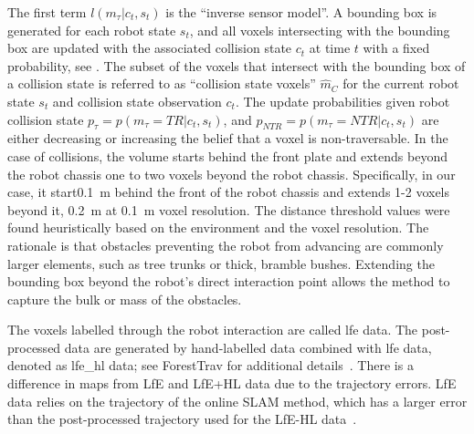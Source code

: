 The first term $l(m_\tau | c_t,  s_{t})$ is the ``inverse sensor model''. A bounding box is generated for each robot state $s_t$, and all voxels intersecting with the bounding box are updated with the associated collision state $c_t$ at time $t$ with a fixed probability, see . The subset of the voxels that intersect with the bounding box of a collision state is referred to as ``collision state voxels'' $\hat{m}_{C}$ for the current robot state $s_t$ and collision state observation $c_t$. The update probabilities given robot collision state $p_{\tau}= p(m_\tau = TR | c_t, s_{t}) $, and $p_{NTR}= p( m_\tau = NTR | c_t, s_{t})$ are either decreasing or increasing the belief that a voxel is non-traversable. In the case of collisions, the volume starts behind the front plate and extends beyond the robot chassis one to two voxels beyond the robot chassis. Specifically, in our case, it start\qty{0.1}{\m} behind the front of the robot chassis and extends 1-2 voxels beyond it, \qty{0.2}{\m}  at \qty{0.1}{\m} voxel resolution. The distance threshold values were found heuristically based on the environment and the voxel resolution. The rationale is that obstacles preventing the robot from advancing are commonly larger elements, such as tree trunks or thick, bramble bushes. Extending the bounding box beyond the robot's direct interaction point allows the method to capture the bulk or mass of the obstacles.

The voxels labelled through the robot interaction are called \ac{lfe} data. The post-processed data are generated by hand-labelled data combined with \ac{lfe} data, denoted as \ac{lfe_hl} data; see ForestTrav for additional details~\cite{ruetz2024foresttrav}. There is a difference in maps from LfE and LfE+HL data due to the trajectory errors. LfE data relies on the trajectory of the online SLAM method, which has a larger error than the post-processed trajectory used for the LfE-HL data~\cite{ramezani2022wildcat}. 
 
